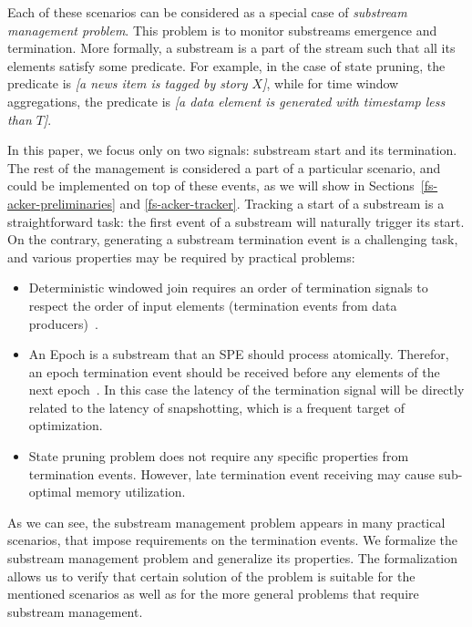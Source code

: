 Each of these scenarios can be considered as a special case of {\em substream management problem}. This problem is to monitor substreams emergence and termination. More formally, a substream is a part of the stream such that all its elements satisfy some predicate. For example, in the case of state pruning, the predicate is {\em [a news item is tagged by story $X$]}, while for time window aggregations, the predicate is {\em [a data element is generated with timestamp less than $T$]}. 

In this paper, we focus only on two signals: substream start and its termination. The rest of the management is considered a part of a particular scenario, and could be implemented on top of these events, as we will show in Sections~\ref{fs-acker-preliminaries} and \ref{fs-acker-tracker}. Tracking a start of a substream is a straightforward task: the first event of a substream will naturally trigger its start. On the contrary, generating a substream termination event is a challenging task, and various properties may be required by practical problems:
\begin{itemize}
    \item Deterministic windowed join requires an order of termination signals to respect the order of input elements (termination events from data producers)~\cite{najdataei2019stretch, gulisano2016scalejoin}.
    \item An Epoch is a substream that an SPE should process atomically. Therefor, an epoch termination event should be received before any elements of the next epoch~\cite{2015arXiv150608603C}. In this case the latency of the termination signal will be directly related to the latency of snapshotting, which is a frequent target of optimization.
    \item State pruning problem does not require any specific properties from termination events. However, late termination event receiving may cause sub-optimal memory utilization.
\end{itemize}

As we can see, the substream management problem appears in many practical scenarios, that impose requirements on the termination events. We formalize the substream management problem and generalize its properties. The formalization allows us to verify that certain solution of the problem is suitable for the mentioned scenarios as well as for the more general problems that require substream management.

